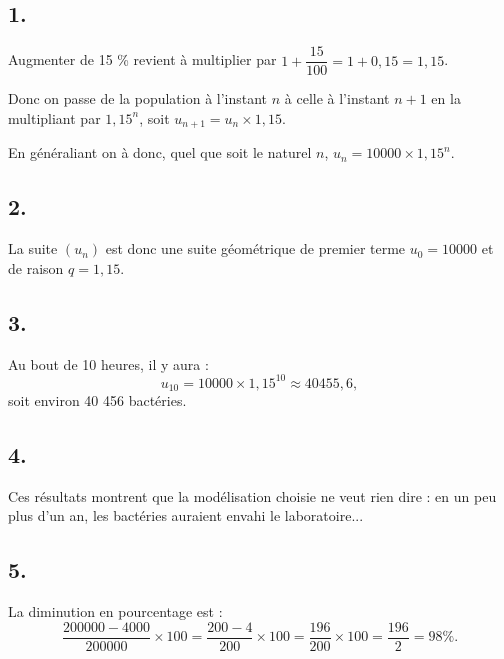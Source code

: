 \subsection*{1.}

Augmenter de 15 \% revient à multiplier par \(1 + \dfrac{15}{100} = 1 + 0{,}15 = 1{,}15\).

Donc on passe de la population à l'instant \(n\) à celle à l'instant \(n+1\) en la multipliant par \(1{,}15^n\), soit \(u_{n+1} = u_n \times 1{,}15\).

En généraliant on à donc, quel que soit le naturel \(n\), \(u_n = 10000 \times 1{,}15^n\).

\subsection*{2.}

La suite \((u_n)\) est donc une suite géométrique de premier terme \(u_0 = 10000\) et de raison \(q = 1{,}15\).

\subsection*{3.}

Au bout de 10 heures, il y aura :
\[
u_{10} = 10000 \times 1{,}15^{10} \approx 40455{,}6,
\]
soit environ 40 456 bactéries.

\subsection*{4.}

Ces résultats montrent que la modélisation choisie ne veut rien dire : en un peu plus d'un an, les bactéries auraient envahi le laboratoire...

\subsection*{5.}

La diminution en pourcentage est :
\[
\dfrac{200000 - 4000}{200000} \times 100 = \dfrac{200 - 4}{200} \times 100 = \dfrac{196}{200} \times 100 = \dfrac{196}{2} = 98 \%.
\]
